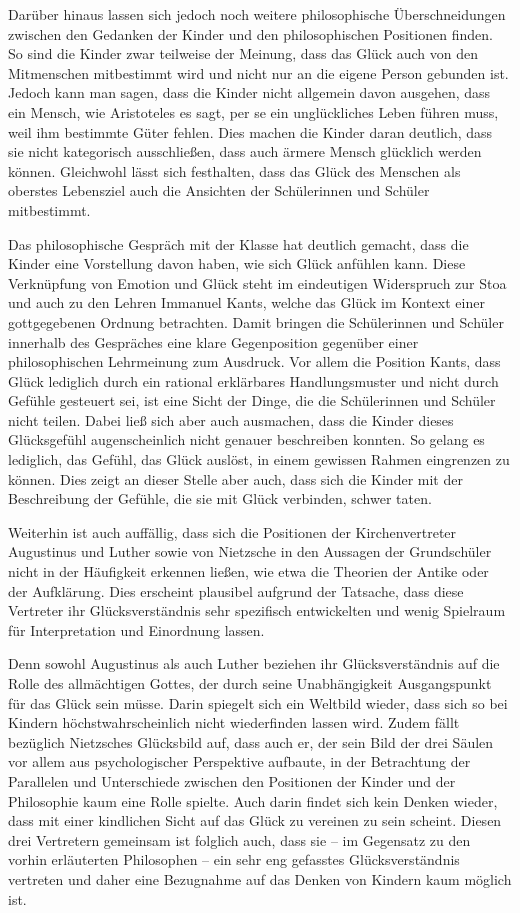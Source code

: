 Darüber hinaus lassen sich jedoch noch weitere philosophische Überschneidungen zwischen den Gedanken der Kinder und den philosophischen Positionen finden. 
So sind die Kinder zwar teilweise der Meinung, dass das Glück auch von den Mitmenschen mitbestimmt wird und nicht nur an die eigene Person gebunden ist. 
Jedoch kann man sagen, dass die Kinder nicht allgemein davon ausgehen, dass ein Mensch, wie Aristoteles es sagt, per se ein unglückliches Leben führen muss, weil ihm bestimmte Güter fehlen. 
Dies machen die Kinder daran deutlich, dass sie nicht kategorisch ausschließen, dass auch ärmere Mensch glücklich werden können.
Gleichwohl lässt sich festhalten, dass das Glück des Menschen als oberstes Lebensziel auch die Ansichten der Schülerinnen und Schüler mitbestimmt. 

Das philosophische Gespräch mit der Klasse hat deutlich gemacht, dass die Kinder eine Vorstellung davon haben, wie sich Glück anfühlen kann. 
Diese Verknüpfung von Emotion und Glück steht im eindeutigen Widerspruch zur Stoa und auch zu den Lehren Immanuel Kants, welche das Glück im Kontext einer gottgegebenen Ordnung betrachten.
Damit bringen die Schülerinnen und Schüler innerhalb des Gespräches  eine klare Gegenposition gegenüber einer philosophischen Lehrmeinung  zum Ausdruck. 
Vor allem die Position Kants, dass Glück lediglich durch ein rational erklärbares Handlungsmuster und nicht durch Gefühle gesteuert sei, ist eine Sicht der Dinge, die die Schülerinnen und Schüler nicht teilen. 
Dabei ließ sich aber auch ausmachen, dass die Kinder dieses Glücksgefühl augenscheinlich nicht genauer beschreiben konnten.
So gelang es lediglich, das Gefühl, das Glück auslöst, in einem gewissen Rahmen eingrenzen zu können.
Dies zeigt an dieser Stelle aber auch, dass sich die Kinder mit der Beschreibung der Gefühle, die sie mit Glück verbinden, schwer taten.

Weiterhin ist auch auffällig, dass sich die Positionen der Kirchenvertreter Augustinus und Luther sowie von Nietzsche in den Aussagen der Grundschüler nicht in der Häufigkeit erkennen ließen, wie etwa die Theorien der Antike oder der Aufklärung. 
Dies erscheint plausibel aufgrund der Tatsache, dass diese Vertreter ihr Glücksverständnis sehr spezifisch entwickelten und wenig Spielraum für Interpretation und Einordnung lassen. 

Denn sowohl Augustinus als auch Luther beziehen ihr Glücksverständnis auf die Rolle des allmächtigen Gottes, der durch seine Unabhängigkeit Ausgangspunkt für das Glück sein müsse. 
Darin spiegelt sich ein Weltbild wieder, dass sich so bei Kindern höchstwahrscheinlich nicht wiederfinden lassen wird. 
Zudem fällt bezüglich Nietzsches Glücksbild auf, dass auch er, der sein Bild der drei Säulen vor allem aus psychologischer Perspektive  aufbaute, in der Betrachtung der Parallelen und Unterschiede zwischen den Positionen der Kinder und der Philosophie kaum eine Rolle spielte. 
Auch darin findet sich kein Denken wieder, dass mit einer kindlichen Sicht auf das Glück zu vereinen zu sein scheint. 
Diesen drei Vertretern gemeinsam ist folglich auch, dass sie -- im Gegensatz zu den vorhin erläuterten Philosophen -- ein sehr eng gefasstes Glücksverständnis vertreten und daher eine Bezugnahme auf das Denken von Kindern kaum möglich ist. 

